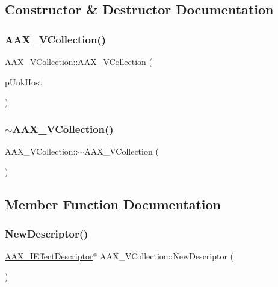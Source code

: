 \subsection{Constructor \& Destructor Documentation}
\mbox{\label{a01897_a68a62b3180bba5ede9b57402a241d8a5}} 
\subsubsection{\texorpdfstring{AAX\_VCollection()}{AAX\_VCollection()}}
{\footnotesize\ttfamily A\+A\+X\+\_\+\+V\+Collection\+::\+A\+A\+X\+\_\+\+V\+Collection (\begin{DoxyParamCaption}\item[{\mbox{\hyperlink{a01409}{I\+A\+C\+F\+Unknown}} $\ast$}]{p\+Unk\+Host }\end{DoxyParamCaption})}

\mbox{\label{a01897_a1ce394bb2ce45e72174d2d85c868c454}} 
\subsubsection{\texorpdfstring{$\sim$AAX\_VCollection()}{~AAX\_VCollection()}}
{\footnotesize\ttfamily A\+A\+X\+\_\+\+V\+Collection\+::$\sim$\+A\+A\+X\+\_\+\+V\+Collection (\begin{DoxyParamCaption}{ }\end{DoxyParamCaption})}



\subsection{Member Function Documentation}
\mbox{\label{a01897_a4f7845b62f8403ca700706500d54473b}} 
\subsubsection{\texorpdfstring{NewDescriptor()}{NewDescriptor()}}
{\footnotesize\ttfamily \mbox{\hyperlink{a01813}{A\+A\+X\+\_\+\+I\+Effect\+Descriptor}}$\ast$ A\+A\+X\+\_\+\+V\+Collection\+::\+New\+Descriptor (\begin{DoxyParamCaption}{ }\end{DoxyParamCaption})\hspace{0.3cm}{\ttfamily [virtual]}}



